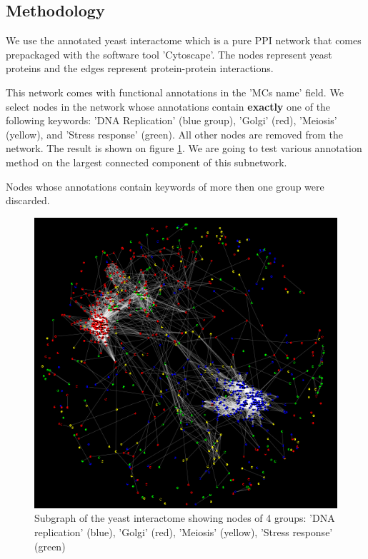 \documentclass[a4paper,10pt]{article}
\theoremstyle{definition}
\theoremstyle{remark}
\theoremstyle{plain}
\begin{document}
\subsection{Methodology}
We use the annotated yeast interactome which is a pure PPI network that comes
prepackaged with the
software tool 'Cytoscape'. The nodes represent yeast proteins and the edges
represent protein-protein interactions.

This network comes with functional annotations in the 'MCs name' field. We
select nodes in the network whose annotations contain \textbf{exactly} one
of the following
keywords:  'DNA Replication' (blue group), 'Golgi' (red), 'Meiosis' (yellow),
and 'Stress response' (green). All other nodes are removed from the network.
The result is shown on figure \ref{fig:yeast_subgraph_4groups}. We are going to
test various annotation method on the largest connected component of this
subnetwork.

Nodes whose annotations contain keywords of more then one group were discarded.

\begin{figure}
\centering
\includegraphics[width=\textwidth]{yeastsubgraph_4_groups_colorcode.png}
\caption{Subgraph of the yeast interactome showing nodes of 4 groups: 'DNA
replication' (blue), 'Golgi' (red), 'Meiosis' (yellow), 'Stress response'
(green)}
\label{fig:yeast_subgraph_4groups}
\end{figure}
\end{document}
